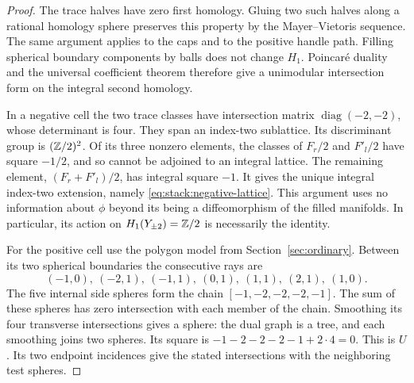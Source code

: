\begin{proof}
The trace halves have zero first homology.  Gluing two such halves along
a rational homology sphere preserves this property by the
Mayer--Vietoris sequence.  The same argument applies to the caps and to
the positive handle path.  Filling spherical boundary components by
balls does not change \(H_1\).  Poincar\'e duality and the universal
coefficient theorem therefore give a unimodular intersection form on
the integral second homology.

In a negative cell the two trace classes have intersection matrix
\(\operatorname{diag}(-2,-2)\), whose determinant is four.  They span
an index-two sublattice.  Its discriminant group is
\((\mathbb Z/2)^2\).  Of its three nonzero elements, the classes of
\(F_r/2\) and \(F'_l/2\) have square \(-1/2\), and so cannot be
adjoined to an integral lattice.  The remaining element,
\((F_r+F'_l)/2\), has integral square \(-1\).  It gives the unique
integral index-two extension, namely \eqref{eq:stack:negative-lattice}.
This argument uses no information about \(\phi\) beyond its being a
diffeomorphism of the filled manifolds.  In particular, its action on
\(H_1(Y_{\pm2})=\mathbb Z/2\) is necessarily the identity.

For the positive cell use the polygon model from
Section~\ref{sec:ordinary}.  Between its two spherical boundaries the
consecutive rays are
\[
 (-1,0),\ (-2,1),\ (-1,1),\ (0,1),\ (1,1),\ (2,1),\ (1,0).
\]
The five internal side spheres form the chain
\([-1,-2,-2,-2,-1]\).  The sum of these spheres has zero intersection
with each member of the chain.  Smoothing its four transverse
intersections gives a sphere: the dual graph is a tree, and each
smoothing joins two spheres.  Its square is
\(-1-2-2-2-1+2\cdot4=0\).  This is \(U\).
Its two endpoint incidences give the stated intersections with the
neighboring test spheres.


\end{proof}
